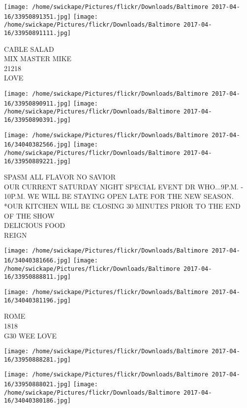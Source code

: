 \documentclass[10pt,letterpaper]{article}
\begin{document}
\texttt{[image: /home/swickape/Pictures/flickr/Downloads/Baltimore 2017-04-16/33950891351.jpg]}
\texttt{[image: /home/swickape/Pictures/flickr/Downloads/Baltimore 2017-04-16/33950891111.jpg]}

CABLE SALAD\\
MIX MASTER MIKE\\
21218\\
LOVE\\
\pagebreak

\texttt{[image: /home/swickape/Pictures/flickr/Downloads/Baltimore 2017-04-16/33950890911.jpg]}
\texttt{[image: /home/swickape/Pictures/flickr/Downloads/Baltimore 2017-04-16/33950890391.jpg]}

\texttt{[image: /home/swickape/Pictures/flickr/Downloads/Baltimore 2017-04-16/34040382566.jpg]}
\texttt{[image: /home/swickape/Pictures/flickr/Downloads/Baltimore 2017-04-16/33950889221.jpg]}

SPASM ALL FLAVOR NO SAVIOR\\
OUR CURRENT SATURDAY NIGHT SPECIAL EVENT DR WHO...9P.M. {-} 10P.M. WE WILL BE STAYING OPEN LATE FOR THE NEW SEASON.  *OUR KITCHEN WILL BE CLOSING 30 MINUTES PRIOR TO THE END OF THE SHOW\\
DELICIOUS FOOD\\
REIGN\\
\pagebreak

\texttt{[image: /home/swickape/Pictures/flickr/Downloads/Baltimore 2017-04-16/34040381666.jpg]}
\texttt{[image: /home/swickape/Pictures/flickr/Downloads/Baltimore 2017-04-16/33950888811.jpg]}

\vspace{0.25in}
\texttt{[image: /home/swickape/Pictures/flickr/Downloads/Baltimore 2017-04-16/34040381196.jpg]}

ROME\\
1818\\
G30 WEE LOVE\\
\pagebreak

\texttt{[image: /home/swickape/Pictures/flickr/Downloads/Baltimore 2017-04-16/33950888281.jpg]}

\vspace{0.25in}
\texttt{[image: /home/swickape/Pictures/flickr/Downloads/Baltimore 2017-04-16/33950888021.jpg]}
\texttt{[image: /home/swickape/Pictures/flickr/Downloads/Baltimore 2017-04-16/34040380186.jpg]}
\end{document}
